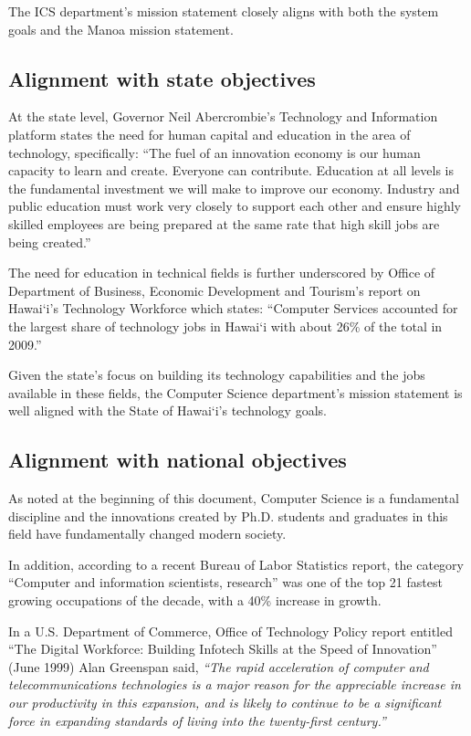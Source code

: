 \documentclass[12pt]{article}
\begin{document}
The ICS department’s mission statement closely aligns with both the system
goals and the Manoa mission statement. 


\subsection{Alignment with state objectives}

At the state level, Governor Neil Abercrombie's Technology and Information
platform states the need for human capital and education in the area of
technology, specifically: “The fuel of an innovation economy is our human
capacity to learn and create. Everyone can contribute. Education at all
levels is the fundamental investment we will make to improve our
economy. Industry and public education must work very closely to support
each other and ensure highly skilled employees are being prepared at the
same rate that high skill jobs are being created.”

The need for education in technical fields is further underscored by Office
of Department of Business, Economic Development and Tourism’s report on
Hawai`i's Technology Workforce which states: “Computer Services accounted
for the largest share of technology jobs in Hawai`i with about 26\% of the
total in 2009.”

Given the state's focus on building its technology capabilities and the
jobs available in these fields, the Computer Science department’s mission
statement is well aligned with the State of Hawai`i's technology goals.

\subsection{Alignment with national objectives}

As noted at the beginning of this document, Computer Science is a
fundamental discipline and the innovations created by Ph.D. students and
graduates in this field have fundamentally changed modern society. 

In addition, according to a recent Bureau of Labor Statistics report, the
category ``Computer and information scientists, research'' was one of the
top 21 fastest growing occupations of the decade, with a 40\% increase in
growth. 

In a U.S. Department of Commerce, Office of Technology Policy report
entitled “The Digital Workforce: Building Infotech Skills at the Speed of
Innovation” (June 1999) Alan Greenspan said, {\em ``The rapid acceleration of
computer and telecommunications technologies is a major reason for the
appreciable increase in our productivity in this expansion, and is likely
to continue to be a significant force in expanding standards of living into
the twenty-first century.”}  
\end{document}
